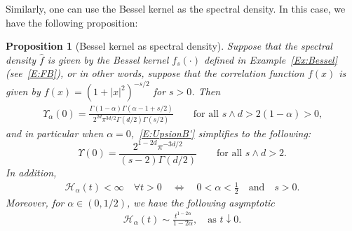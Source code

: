 \documentclass[sn-mathphys]{sn-jnl}%
\numberwithin{equation}{section}
\theoremstyle{thmstyleone}%
\newtheorem{proposition}[theorem]{Proposition}%
\theoremstyle{thmstyletwo}%
\theoremstyle{thmstylethree}%
\begin{document}
Similarly, one can use the Bessel kernel as the spectral density. In this case, we have the
following proposition:

\begin{proposition}[Bessel kernel as spectral density]\label{P:Bessel'}
  Suppose that the spectral density $\widehat{f}$ is given by the Bessel kernel $f_s(\cdot)$ defined
  in Example~\ref{Ex:Bessel} (see~\eqref{E:FB}), or in other words, suppose that the correlation
  function $f(x)$ is given by $f(x) = \left(1+\lvert x \rvert^2\right)^{-s/2}$ for $s>0$. Then
  \begin{align}\label{E:UpsionB'}
    \Upsilon_{\alpha}(0)
    = \frac{\Gamma\left(1 - \alpha\right) \Gamma\left(\alpha - 1 + s/2\right)}{2^{2d} \pi^{3d/2} \Gamma(d/2)\Gamma\left(s/2\right) }
    \qquad \text{for all $s\wedge d>2(1-\alpha)>0$,}
  \end{align}
   and in particular when $\alpha = 0$,~\eqref{E:UpsionB'} simplifies to the following:
  \begin{equation}\label{E:Upsilon_0'}
     \Upsilon(0) = \frac{2^{1-2 d}\pi^{-3d/2}}{(s-2)\Gamma\left(d/2\right)}
     \qquad \text{for all $s\wedge d>2$.}
  \end{equation}
  In addition,
  \begin{gather}\label{E:HaB'}
    \mathcal{H}_\alpha(t) <\infty \quad \forall t>0 \quad \Longleftrightarrow \quad
    0<\alpha<\frac{1}{2} \quad \text{and} \quad s>0.
  \end{gather}
 Moreover, for $\alpha\in(0,1/2)$, we have the following asymptotic
  \begin{align}\label{E:HaBS'}
    \mathcal{H}_\alpha(t) \sim \frac{t^{1-2\alpha}}{1-2\alpha}, \quad \text{as $t\downarrow 0.$}
  \end{align}
\end{proposition}
\end{document}
